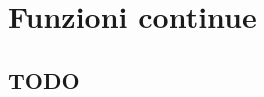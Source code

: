 


\chapter{Funzioni continue}

\section{TODO}
\begin{comment}
 
Schema del capitolo
===================

Limiti
------

Continuità
----------

  C. in un punto
  ''''''''''''''
  
    Definizione
    ...........
  
      Definizioni equivalenti
      
    Punti di discontinuità e di non derivabilità
    ............................................
 
  C. in un intervallo
  '''''''''''''''''''
  
    Definizione
    ...........
  
      Teorema funzioni elementari
      Teorema composizione di funzioni
      
    Insieme e sottoinsiemi delle funzioni
    .....................................
    
Massimi e minimi
----------------

  Definizione
  '''''''''''
  
    Teorema del punto critico
    
  Proprietà delle f. continue
  '''''''''''''''''''''''''''
  
    I numeri iperinteri
    ...................
    
    Teorema degli zeri
    
    Teorema dei valori estremanti
    
    Teorema di Rolle
    
    Teorema di Lagrange
    
    Corollario

\end{comment}

\begin{comment}
\begin{center}
\begin{inaccessibleblock}[TODO.]
  \telescopio
\end{inaccessibleblock}
\end{center}
\end{comment}

